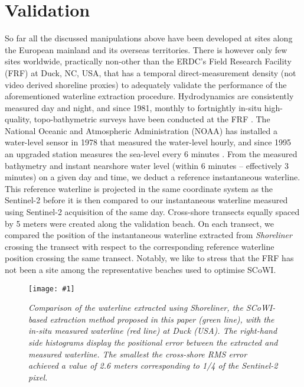 \documentclass[remotesensing,technicalnote,submit,pdftex,moreauthors]{Definitions/mdpi}
\newcommand{\myfigure}[4]{
    \begin{figure*}[ht!]
        \centering
        \texttt{[image: \#1]}	 
        \caption{\itshape#2}
        \label{#3}
    \end{figure*} 
}
\begin{document}
\section{Validation}
So far all the discussed manipulations above have been developed at sites along the European mainland and its overseas territories. There is however only few sites worldwide, practically non-other than the ERDC's Field Research Facility (FRF) at Duck, NC, USA, that has a temporal direct-measurement density (not video derived shoreline proxies) to adequately validate the performance of the aforementioned waterline extraction procedure. Hydrodynamics are consistently measured day and night, and since 1981, monthly to fortnightly in-situ high-quality, topo-bathymetric surveys have been conducted at the FRF \citep{FORTE2017}. The National Oceanic and Atmospheric Administration (NOAA) has installed a water-level sensor in 1978 that measured the water-level hourly, and since 1995 an upgraded station measures the sea-level every 6 minutes \citep{park2014water}. From the measured bathymetry and instant nearshore water level (within 6 minutes -- effectively 3 minutes) on a given day and time, we deduct a reference instantaneous waterline. This reference waterline is projected in the same coordinate system as the Sentinel-2 before it is then compared to our instantaneous waterline measured using Sentinel-2 acquisition of the same day.
Cross-shore transects equally spaced by 5 meters were created along the validation beach. On each transect, we compared the position of the instantaneous waterline extracted from \textit{Shoreliner} crossing the transect with respect to the corresponding reference waterline position crossing the same transect.
Notably, we like to stress that the FRF has not been a site among the representative beaches used to optimise SCoWI.

\myfigure{img/Results.png}{Comparison of the waterline extracted using \textit{Shoreliner}, the SCoWI-based extraction method proposed in this paper (green line), with the in-situ measured waterline (red line) at Duck (USA). The right-hand side histograms display the positional error between the extracted and measured waterline. The smallest the cross-shore RMS error achieved a value of 2.6 meters corresponding to 1/4 of the Sentinel-2 pixel.}{validation}{1}
\end{document}
